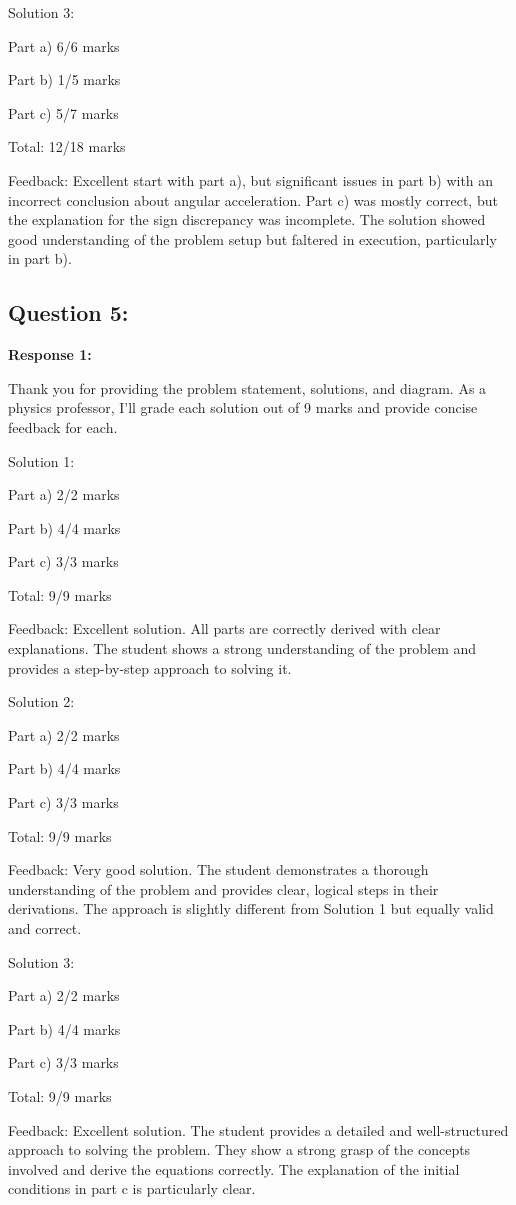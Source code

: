 \documentclass[a4paper,11pt]{article}
\begin{document}
Solution 3:

Part a) 6/6 marks

Part b) 1/5 marks

Part c) 5/7 marks

Total: 12/18 marks

Feedback: Excellent start with part a), but significant issues in part b) with an incorrect conclusion about angular acceleration. Part c) was mostly correct, but the explanation for the sign discrepancy was incomplete. The solution showed good understanding of the problem setup but faltered in execution, particularly in part b).

\subsection*{Question 5:}

\textbf{Response 1:}

Thank you for providing the problem statement, solutions, and diagram. As a physics professor, I'll grade each solution out of 9 marks and provide concise feedback for each.

Solution 1:

Part a) 2/2 marks

Part b) 4/4 marks

Part c) 3/3 marks

Total: 9/9 marks

Feedback: Excellent solution. All parts are correctly derived with clear explanations. The student shows a strong understanding of the problem and provides a step-by-step approach to solving it.

Solution 2:

Part a) 2/2 marks

Part b) 4/4 marks

Part c) 3/3 marks

Total: 9/9 marks

Feedback: Very good solution. The student demonstrates a thorough understanding of the problem and provides clear, logical steps in their derivations. The approach is slightly different from Solution 1 but equally valid and correct.

Solution 3:

Part a) 2/2 marks

Part b) 4/4 marks

Part c) 3/3 marks

Total: 9/9 marks

Feedback: Excellent solution. The student provides a detailed and well-structured approach to solving the problem. They show a strong grasp of the concepts involved and derive the equations correctly. The explanation of the initial conditions in part c is particularly clear.
\end{document}

